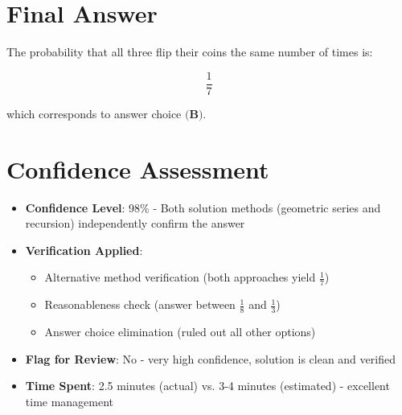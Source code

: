 \documentclass[11pt]{article}
\begin{document}
\section*{Final Answer}

The probability that all three flip their coins the same number of times is:

\[\boxed{\frac{1}{7}}\]

which corresponds to answer choice $\textbf{(B)}$.

\section*{Confidence Assessment}

\begin{itemize}[leftmargin=*]
    \item \textbf{Confidence Level}: 98\% - Both solution methods (geometric series and recursion) independently confirm the answer
    \item \textbf{Verification Applied}: 
    \begin{itemize}
        \item Alternative method verification (both approaches yield $\frac{1}{7}$)
        \item Reasonableness check (answer between $\frac{1}{8}$ and $\frac{1}{3}$)
        \item Answer choice elimination (ruled out all other options)
    \end{itemize}
    \item \textbf{Flag for Review}: No - very high confidence, solution is clean and verified
    \item \textbf{Time Spent}: 2.5 minutes (actual) vs. 3-4 minutes (estimated) - excellent time management
\end{itemize}
\end{document}
